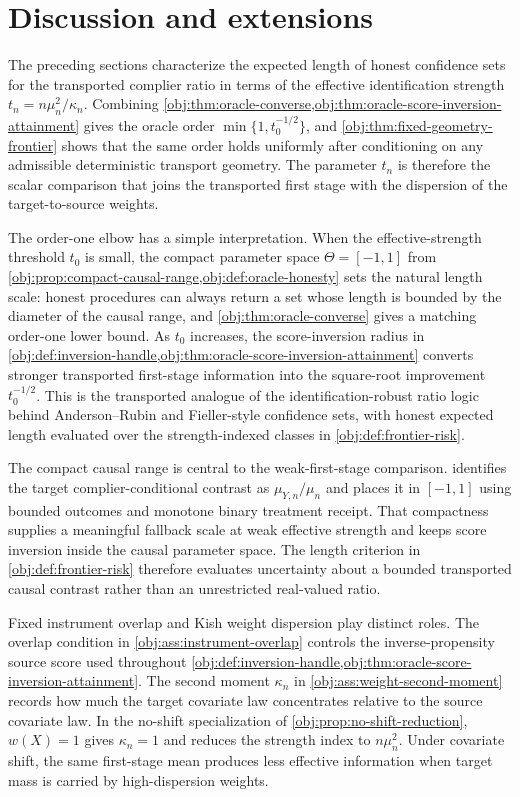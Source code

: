 \section{Discussion and extensions}

The preceding sections characterize the expected length of honest confidence sets for the transported complier ratio in terms of the effective identification strength \(t_n=n\mu_n^2/\kappa_n\). Combining \cref{obj:thm:oracle-converse,obj:thm:oracle-score-inversion-attainment} gives the oracle order \(\min\{1,t_0^{-1/2}\}\), and \cref{obj:thm:fixed-geometry-frontier} shows that the same order holds uniformly after conditioning on any admissible deterministic transport geometry. The parameter \(t_n\) is therefore the scalar comparison that joins the transported first stage with the dispersion of the target-to-source weights.

The order-one elbow has a simple interpretation. When the effective-strength threshold \(t_0\) is small, the compact parameter space \(\Theta=[-1,1]\) from \cref{obj:prop:compact-causal-range,obj:def:oracle-honesty} sets the natural length scale: honest procedures can always return a set whose length is bounded by the diameter of the causal range, and \cref{obj:thm:oracle-converse} gives a matching order-one lower bound. As \(t_0\) increases, the score-inversion radius in \cref{obj:def:inversion-handle,obj:thm:oracle-score-inversion-attainment} converts stronger transported first-stage information into the square-root improvement \(t_0^{-1/2}\). This is the transported analogue of the identification-robust ratio logic behind Anderson--Rubin and Fieller-style confidence sets, with honest expected length evaluated over the strength-indexed classes in \cref{obj:def:frontier-risk}.

The compact causal range is central to the weak-first-stage comparison.  identifies the target complier-conditional contrast as \(\mu_{Y,n}/\mu_n\) and places it in \([-1,1]\) using bounded outcomes and monotone binary treatment receipt. That compactness supplies a meaningful fallback scale at weak effective strength and keeps score inversion inside the causal parameter space. The length criterion in \cref{obj:def:frontier-risk} therefore evaluates uncertainty about a bounded transported causal contrast rather than an unrestricted real-valued ratio.

Fixed instrument overlap and Kish weight dispersion play distinct roles. The overlap condition in \cref{obj:ass:instrument-overlap} controls the inverse-propensity source score used throughout \cref{obj:def:inversion-handle,obj:thm:oracle-score-inversion-attainment}. The second moment \(\kappa_n\) in \cref{obj:ass:weight-second-moment} records how much the target covariate law concentrates relative to the source covariate law. In the no-shift specialization of \cref{obj:prop:no-shift-reduction}, \(w(X)=1\) gives \(\kappa_n=1\) and reduces the strength index to \(n\mu_n^2\). Under covariate shift, the same first-stage mean produces less effective information when target mass is carried by high-dispersion weights.

